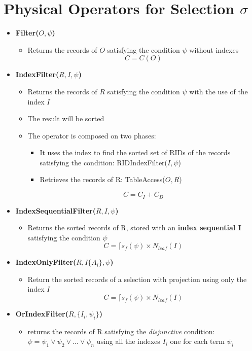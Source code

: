 \section{Physical Operators for Selection $\sigma$}
\begin{itemize}
    \item \textbf{Filter($O, \psi$)}
    \begin{itemize}
        \item Returns the records of $O$ satisfying the condition $\psi$ without indexes
        $$C = C(O)$$
    \end{itemize}
    \item \textbf{IndexFilter($R,I,\psi$)}
    \begin{itemize}
        \item Returns the records of $R$ satisfying the condition $\psi$ with the use of the index $I$
        \item The result will be sorted
        \item The operator is composed on two phases:
        \begin{itemize}
            \item It uses the index to find the sorted set of RIDs of the records satisfying the condition: RIDIndexFilter($I, \psi$)
            \item Retrieves the records of R: TableAccess($O, R$)
        \end{itemize}
        $$C = C_I + C_D$$
    \end{itemize}
    \item \textbf{IndexSequentialFilter($R,I, \psi$)}
    \begin{itemize}
        \item Returns the sorted records of R, stored with an \textbf{index sequential I} satisfying the condition $\psi$
        $$C = \lceil s_f(\psi) \times N_{leaf}(I)$$
    \end{itemize}
    \item \textbf{IndexOnlyFilter($R,I\{A_i\}, \psi$)}
    \begin{itemize}
        \item Return the sorted records of a selection with projection using only the index $I$
        $$C = \lceil s_f(\psi) \times N_{leaf}(I)$$
    \end{itemize}
    \item \textbf{OrIndexFilter($R, \{I_i, \psi_i\}$)}
    \begin{itemize}
        \item returns the records of R satisfying the \textit{disjunctive} condition: $\psi = \psi_1 \lor \psi_2 \lor ... \lor \psi_n$ using all the indexes $I_i$ one for each term $\psi_i$

\end{itemize}
\end{itemize}
